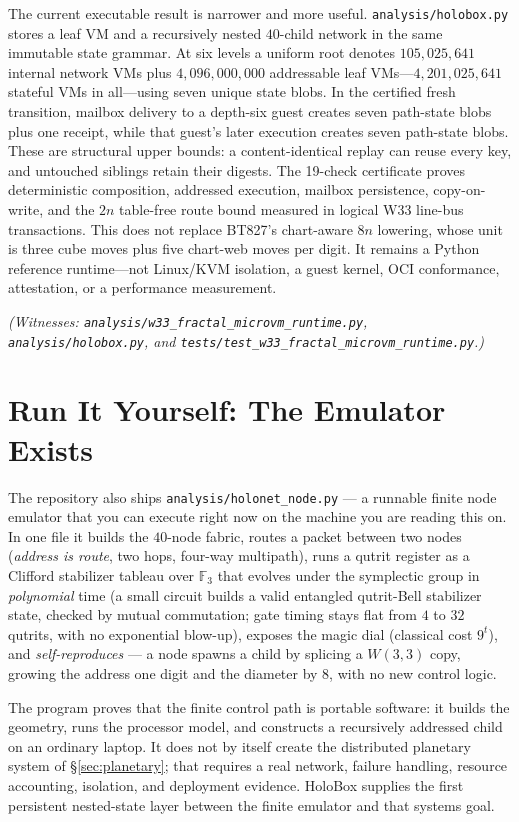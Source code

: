 \documentclass[11pt]{article}
\begin{document}
The current executable result is narrower and more useful. \texttt{analysis/holobox.py} stores a leaf
VM and a recursively nested $40$-child network in the same immutable state grammar. At six levels a
uniform root denotes $105{,}025{,}641$ internal network VMs plus $4{,}096{,}000{,}000$ addressable
leaf VMs---$4{,}201{,}025{,}641$ stateful VMs in all---using seven unique state blobs. In the
certified fresh transition, mailbox delivery to a depth-six guest creates seven path-state blobs plus
one receipt, while that guest's later execution creates seven path-state blobs. These are structural
upper bounds: a content-identical replay can reuse every key, and untouched siblings retain their
digests. The 19-check certificate proves deterministic composition, addressed execution,
mailbox persistence, copy-on-write, and the $2n$ table-free route bound measured in logical W33
line-bus transactions. This does not replace BT827's chart-aware $8n$ lowering, whose unit is three
cube moves plus five chart-web moves per digit. It remains a Python reference
runtime---not Linux/KVM isolation, a guest kernel, OCI conformance, attestation, or a performance
measurement.

\emph{(Witnesses: \texttt{analysis/w33\_fractal\_microvm\_runtime.py},
\texttt{analysis/holobox.py}, and \texttt{tests/test\_w33\_fractal\_microvm\_runtime.py}.)}

\section{Run It Yourself: The Emulator Exists}
\label{sec:emulator}
The repository also ships
\texttt{analysis/holonet\_node.py} --- a runnable finite node emulator that you can execute right now on the
machine you are reading this on. In one file it builds the $40$-node fabric, routes a packet between two
nodes (\emph{address is route}, two hops, four-way multipath), runs a qutrit register as a Clifford
stabilizer tableau over $\mathbb{F}_3$ that evolves under the symplectic group in \emph{polynomial}
time (a small circuit builds a valid entangled qutrit-Bell stabilizer state, checked by mutual
commutation; gate timing stays flat from $4$ to $32$ qutrits, with no exponential blow-up), exposes the
magic dial (classical cost $9^t$), and \emph{self-reproduces} --- a node spawns a child by splicing a
$W(3,3)$ copy, growing the address one digit and the diameter by $8$, with no new control logic.

The program proves that the finite control path is portable software: it builds the geometry, runs the
processor model, and constructs a recursively addressed child on an ordinary laptop. It does not by
itself create the distributed planetary system of \S\ref{sec:planetary}; that requires a real network,
failure handling, resource accounting, isolation, and deployment evidence. HoloBox supplies the first
persistent nested-state layer between the finite emulator and that systems goal.
\end{document}
